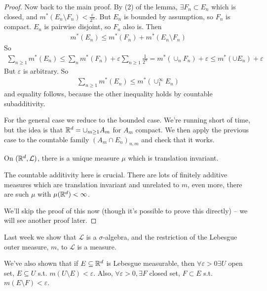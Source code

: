 \documentclass[a4paper]{article}
\begin{document}
\begin{prop}
\begin{proof}
Now back to the main proof. By (2) of the lemma, $\exists F_n \subset E_n$ which is closed, and $m^*(E_n \setminus F_n) < \frac{\varepsilon}{2^n}$. But $E_n$ is bounded by assumption, so $F_n$ is compact. $E_n$ is pairwise disjoint, so $F_n$ also is. Then
\begin{equation*}
\begin{aligned}
m^*(E_n) \leq m^*(F_n)+m^*(E_n\setminus F_n)
\end{aligned}
\end{equation*}
So
\begin{equation*}
\begin{aligned}
\sum_{n \geq 1} m^*(E_n) \leq \sum_n m^*(F_n) + \varepsilon\sum_{n \geq 1} \frac{1}{2^n} = m^*(\cup_n F_n) + \varepsilon \leq m^*(\cup E_n)+\varepsilon
\end{aligned}
\end{equation*}
But $\varepsilon$ is arbitrary. So
\begin{equation*}
\begin{aligned}
\sum_{n\geq 1} m^*(E_n) \leq m^*(\cup_1^\infty E_n)
\end{aligned}
\end{equation*}
and equality follows, because the other inequality holds by countable subadditivity.

For the general case we reduce to the bounded case. We're running short of time, but the idea is that $\mathbb{R}^d=\cup_{m\geq 1} A_m$ for $A_m$ compact. We then apply the previous case to the countable family $(A_m \cap E_n)_{n,m}$ and check that it works.

\begin{prop}
On $(\mathbb{R}^d,\mathcal{L})$, there is a unique measure $\mu$ which is translation invariant.
\end{prop}

The countable additivity here is crucial. There are lots of finitely additive measures which are translation invariant and unrelated to $m$, even more, there are such $\mu$ with $\mu(\mathbb{R}^d) <\infty$.

We'll skip the proof of this now (though it's possible to prove this directly) -- we will see another proof later.
\end{proof}
\end{prop}

Last week we show that $\mathcal{L}$ is a $\sigma$-algebra, and the restriction of the Lebesgue outer measure, $m$, to $\mathcal{L}$ is a measure.

We've also shown that if $E \subseteq \mathbb{R}^d$ is Lebesgue measurable, then $\forall \varepsilon>0 \exists U$ open set, $E \subseteq U$ s.t. $m(U \setminus E) < \varepsilon$. Also, $\forall \varepsilon>0, \exists F$ closed set, $F \subset E$ s.t. $m(E\setminus F) < \varepsilon$.
\end{document}
